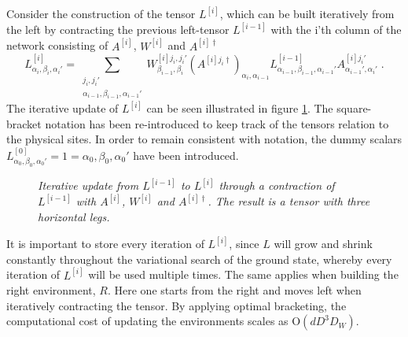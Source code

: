 Consider the construction of the tensor $L^{[i]}$, which can be built iteratively from the left by contracting the previous left-tensor $L^{[i-1]}$ with the i'th column of the network consisting of $A^{[i]}$, $W^{[i]}$ and $A^{[i] \dag}$
\begin{equation}
	L_{\alpha_i , \beta_i , \alpha_i '}^{[i]} = \sum_{\substack{ j_i , j_i ' \\ \alpha_{i-1} , \beta_{i-1} , \alpha_{i-1} '}} W_{\beta_{i-1} , \beta_i}^{[i] j_i , j_i '} \left( A^{[i] j_i \dag} \right)_{\alpha_i , \alpha_{i-1}} L_{\alpha_{i-1} , \beta_{i-1} , \alpha_{i-1} '}^{[i-1]} A_{\alpha_{i-1} ' , \alpha_i '}^{[i] j_i '} \; .
\end{equation}
The iterative update of $L^{[i]}$ can be seen illustrated in figure \ref{fig:buildLTensor}. The square-bracket notation has been re-introduced to keep track of the tensors relation to the physical sites. In order to remain consistent with notation, the dummy scalars $L_{\alpha_0 , \beta_0 , \alpha_0 '}^{[0]}  = 1  = \alpha_0 , \beta_0 , \alpha_0 '$ have been introduced.\\
\begin{figure}[h!]
	\centering
	
	\caption{\textit{Iterative update from $L^{[i-1]}$ to $L^{[i]}$ through a contraction of $L^{[i-1]}$ with $A^{[i]}$, $W^{[i]}$ and $A^{[i] \dag}$. The result is a tensor with three horizontal legs.}}
	\label{fig:buildLTensor}
\end{figure}
It is important to store every iteration of $L^{[i]}$, since $L$ will grow and shrink constantly throughout the variational search of the ground state, whereby every iteration of $L^{[i]}$ will be used multiple times.
The same applies when building the right environment, $R$. Here one starts from the right and moves left when iteratively contracting the tensor. By applying optimal bracketing, the computational cost of updating the environments scales as $\mathrm{O}(d D^3 D_W)$.
  

